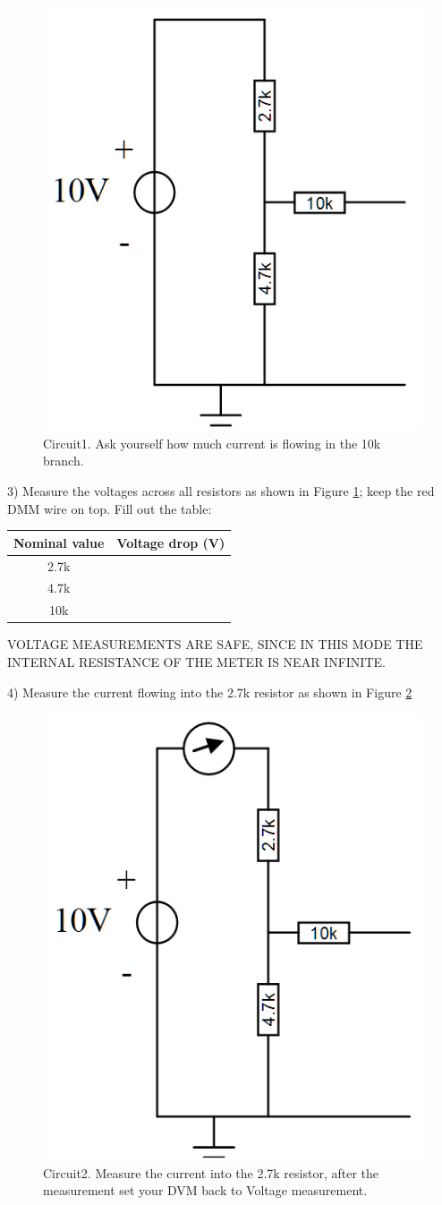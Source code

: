 \documentclass[11pt,letterpaper]{article}
\begin{document}
\begin{figure}
\centering
\includegraphics[width=0.5\linewidth]{Lab1_Circuit1}
\caption{Circuit1. Ask yourself how much current is flowing in the 10k branch.}
\label{fig:Lab1_Circuit1}
\end{figure}

3) Measure the voltages across all resistors as shown in Figure \ref{fig:Lab1_Circuit1}; keep the red DMM wire on top. Fill out the table:

\begin{center}
\begin{tabular}{|c|c|}
\hline Nominal value & Voltage drop (V)\\ 
\hline 2.7k &  \\ 
\hline 4.7k &  \\ 
\hline 10k &  \\ 
\hline 
\end{tabular} 
\end{center}

\begin{center}
VOLTAGE MEASUREMENTS ARE SAFE, SINCE IN THIS MODE THE INTERNAL RESISTANCE OF THE METER IS NEAR INFINITE.
\end{center}

4) Measure the current flowing into the 2.7k resistor as shown in Figure \ref{fig:Lab1_Circuit2}\\ 

\begin{figure}
\centering
\includegraphics[width=0.5\linewidth]{Lab1_Circuit2}
\caption{Circuit2. Measure the current into the 2.7k resistor, after the measurement set your DVM back to Voltage measurement.}
\label{fig:Lab1_Circuit2}
\end{figure}
\end{document}
